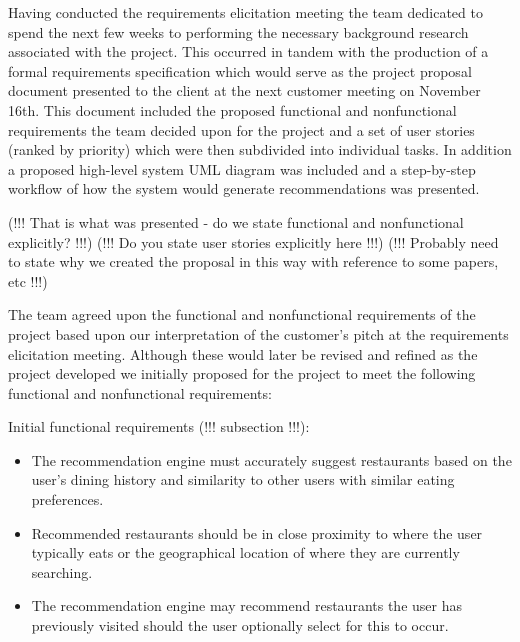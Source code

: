 \documentclass{l3proj}
\begin{document}



Having conducted the requirements elicitation meeting the team dedicated to spend the next few weeks to performing the necessary background research associated with the project. This occurred in tandem with the production of a formal requirements specification which would serve as the project proposal document presented to the client at the next customer meeting on November 16th. This document included the proposed functional and nonfunctional requirements the team decided upon for the project and a set of user stories (ranked by priority) which were then subdivided into individual tasks. In addition a proposed high-level system UML diagram was included and a step-by-step workflow of how the system would generate recommendations was presented. 

(!!! That is what was presented - do we state functional and nonfunctional explicitly? !!!)
(!!! Do you state user stories explicitly here !!!)
(!!! Probably need to state why we created the proposal in this way with reference to some papers, etc !!!)

The team agreed upon the functional and nonfunctional requirements of the project based upon our interpretation of the customer’s pitch at the requirements elicitation meeting. Although these would later be revised and refined as the project developed we initially proposed for the project to meet the following functional and nonfunctional requirements:

Initial functional requirements (!!! subsection !!!):
\begin{itemize}
\item The recommendation engine must accurately suggest restaurants based on the user’s dining history and similarity to other users with similar eating preferences.
\item Recommended restaurants should be in close proximity to where the user typically eats or the geographical location of where they are currently searching.
\item The recommendation engine may recommend restaurants the user has previously visited should the user optionally select for this to occur.
\end{itemize}
\end{document}
